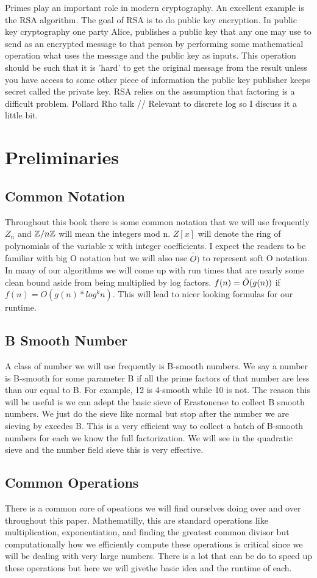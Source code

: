 \documentclass{article}
\begin{document}
Primes play an important role in modern cryptography. An excellent example is the RSA algorithm. The goal of RSA is to do public key encryption. In public key cryptography one party Alice, publishes a public key that any one may use to send as an encrypted message to that person by performing some mathematical operation what uses the message and the public key as inputs. This operation should be such that it is 'hard' to get the original message from the result unless you have access to some other piece of information the public key publisher keeps secret called the private key. RSA relies on the assumption that factoring is a difficult problem. 
Pollard Rho talk // Relevant to discrete log so I discuss it a little bit. 
\section{Preliminaries}
\subsection{Common Notation}
Throughout this book there is some common notation that we will use frequently $Z_n$ and $\mathbb{Z} / n \mathbb{Z}$ will mean the integers mod n. $Z[x]$ will denote the ring of polynomials of the variable x with integer coefficients. I expect the readers to be familiar with big O notation but we will also use $\tilde{O)}$ to represent soft O notation. In many of our algorithms we will come up with run times that are nearly some clean bound aside from being multiplied by log factors. $f(n) = \tilde{O}(g(n))$ if $f(n) = O(g(n) * log^k n)$. This will lead to nicer looking formulas for our runtime. 
\subsection{B Smooth Number}
A class of number we will use frequently is B-smooth numbers. We say a number is B-smooth for some parameter B if all the prime factors of that number are less than our equal to B. For example, 12 is 4-smooth while 10 is not. The reason this will be useful is we can adept the basic sieve of Erastonense to collect B smooth numbers. We just do the sieve like normal but stop after the number we are sieving by excedes B. This is a very efficient way to collect a batch of B-smooth numbers for each we know the full factorization. We will see in the quadratic sieve and the number field sieve this is very effective. 
\subsection{Common Operations}
There is a common core of opeations we will find ourselves doing over and over throughout this paper. Mathematilly, this are standard operations like  multiplication, exponentiation, and finding the greatest common divisor but computationally how we efficiently compute these operations is critical since we will be dealing with very large numbers. There is a lot that can be do to speed up these operations but here we will givethe basic idea and the runtime of each. 
\end{document}

